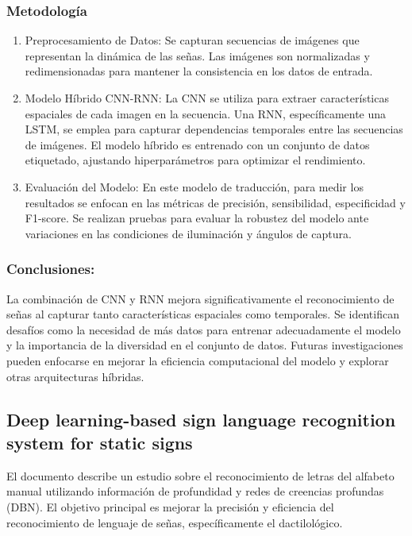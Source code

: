 \subsubsection {Metodología}

\begin{enumerate}
	\item {Preprocesamiento de Datos: }
	Se capturan secuencias de imágenes que representan la dinámica de las señas. Las imágenes son normalizadas y redimensionadas para mantener la consistencia en los datos de entrada.
	\item {Modelo Híbrido CNN-RNN: }
	La CNN se utiliza para extraer características espaciales de cada imagen en la secuencia. Una RNN, específicamente una LSTM, se emplea para capturar dependencias temporales entre las secuencias de imágenes. El modelo híbrido es entrenado con un conjunto de datos etiquetado, ajustando hiperparámetros para optimizar el rendimiento.
	\item {Evaluación del Modelo: }
	En este modelo de traducción, para medir los resultados se enfocan en las métricas de precisión, sensibilidad, especificidad y F1-score. Se realizan pruebas para evaluar la robustez del modelo ante variaciones en las condiciones de iluminación y ángulos de captura.
\end{enumerate}
\subsubsection {Conclusiones: }
	La combinación de CNN y RNN mejora significativamente el reconocimiento de señas al capturar tanto características espaciales como temporales. Se identifican desafíos como la necesidad de más datos para entrenar adecuadamente el modelo y la importancia de la diversidad en el conjunto de datos. Futuras investigaciones pueden enfocarse en mejorar la eficiencia computacional del modelo y explorar otras arquitecturas híbridas.


\subsection{Deep learning-based sign language recognition system for static signs }
	El documento describe un estudio sobre el reconocimiento de letras del alfabeto manual utilizando información de profundidad y redes de creencias profundas (DBN). El objetivo principal es mejorar la precisión y eficiencia del reconocimiento de lenguaje de señas, específicamente el dactilológico.

